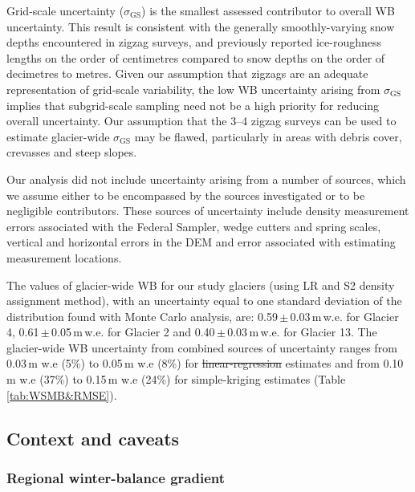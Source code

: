 \documentclass[review,oneside, letterpaper]{igs} %
\providecommand{\DIFadd}[1]{{\protect\color{blue}\uwave{#1}}} %
\providecommand{\DIFdel}[1]{{\protect\color{red}\sout{#1}}}                      %
\providecommand{\DIFaddbegin}{} %
\providecommand{\DIFaddend}{} %
\providecommand{\DIFdelbegin}{} %
\providecommand{\DIFdelend}{} %
\newcommand{\DIFscaledelfig}{0.5}
\newlength{\DIFdelgraphicswidth} %
\newlength{\DIFdelgraphicsheight} %
\newcommand{\DIFaddincludegraphics}[2][]{{\color{blue}\fbox{\DIFOincludegraphics[#1]{#2}}}} %
\newcommand{\DIFdelincludegraphics}[2][]{%
\sbox{\DIFdelgraphicsbox}{\DIFOincludegraphics[#1]{#2}}%
\settoboxwidth{\DIFdelgraphicswidth}{\DIFdelgraphicsbox} %
\settoboxtotalheight{\DIFdelgraphicsheight}{\DIFdelgraphicsbox} %
\scalebox{\DIFscaledelfig}{%
\parbox[b]{\DIFdelgraphicswidth}{\usebox{\DIFdelgraphicsbox}\\[-\baselineskip] \rule{\DIFdelgraphicswidth}{0em}}\llap{\resizebox{\DIFdelgraphicswidth}{\DIFdelgraphicsheight}{%
\setlength{\unitlength}{\DIFdelgraphicswidth}%
\begin{picture}(1,1)%
\thicklines\linethickness{2pt} %
{\color[rgb]{1,0,0}\put(0,0){\framebox(1,1){}}}%
{\color[rgb]{1,0,0}\put(0,0){\line( 1,1){1}}}%
{\color[rgb]{1,0,0}\put(0,1){\line(1,-1){1}}}%
\end{picture}%
}\hspace*{3pt}}} %
} %
\DeclareRobustCommand{\DIFaddbegin}{\DIFOaddbegin \let\includegraphics\DIFaddincludegraphics} %
\DeclareRobustCommand{\DIFaddend}{\DIFOaddend \let\includegraphics\DIFOincludegraphics} %
\DeclareRobustCommand{\DIFdelbegin}{\DIFOdelbegin \let\includegraphics\DIFdelincludegraphics} %
\DeclareRobustCommand{\DIFdelend}{\DIFOaddend \let\includegraphics\DIFOincludegraphics} %
\begin{document}
Grid-scale uncertainty ($\sigma_{\mathrm{GS}}$) is the smallest assessed contributor to overall WB uncertainty. This result is consistent with the generally smoothly-varying snow depths encountered in zigzag surveys, and previously reported ice-roughness lengths on the order of centimetres \citep[e.g.][]{Hock2005} compared to snow depths on the order of decimetres to metres. Given our assumption that zigzags are an adequate representation of grid-scale variability, the low WB uncertainty arising from $\sigma_{\mathrm{GS}}$ implies that subgrid-scale sampling need not be a high priority for reducing overall uncertainty. Our assumption that the 3--4 zigzag surveys can be used to estimate glacier-wide $\sigma_{\mathrm{GS}}$ may be flawed, particularly in areas with debris cover, crevasses and steep slopes.

Our analysis did not include uncertainty arising from a number of sources, which we assume either to be  encompassed by the sources investigated or to be negligible contributors. These sources of uncertainty include density measurement errors associated with the Federal Sampler, wedge cutters and spring scales, vertical and horizontal errors in the DEM and error associated with estimating measurement locations.

The values of glacier-wide WB for our study glaciers (using LR and S2 density assignment method), with an uncertainty equal to one standard deviation of the distribution found with Monte Carlo analysis, are: 0.59\,$\pm$\,0.03\,m\,w.e. for Glacier 4, 0.61\,$\pm$\,0.05\,m\,w.e. for Glacier 2 and 0.40\,$\pm$\,0.03\,m\,w.e. for Glacier 13. The glacier-wide WB uncertainty from combined sources of uncertainty ranges from 0.03\,m w.e (5\%) to 0.05\,m w.e (8\%) for \DIFdelbegin \DIFdel{linear-regression }\DIFdelend \DIFaddbegin \DIFadd{LR }\DIFaddend estimates and from 0.10\,m w.e (37\%) to 0.15\,m w.e (24\%) for simple-kriging estimates (Table \ref{tab:WSMB&RMSE}).

\subsection{Context and caveats}
\subsubsection{Regional winter-balance gradient}
\end{document}
